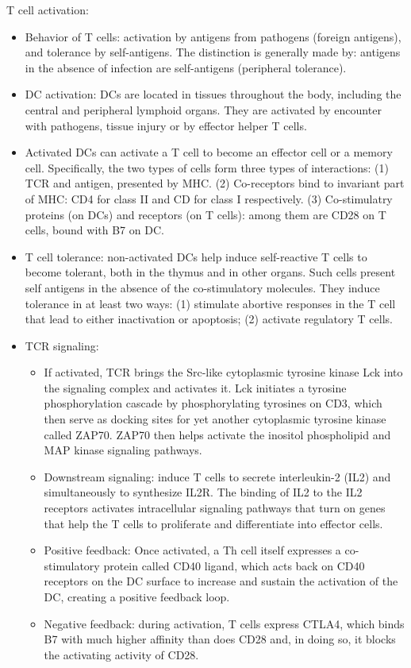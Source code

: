 \documentclass{report}
\begin{document}
T cell activation: 
\begin{itemize}
\item Behavior of T cells: activation by antigens from pathogens (foreign antigens), and tolerance by self-antigens. The distinction is generally made by: antigens in the absence of infection are self-antigens (peripheral tolerance). 

\item DC activation: DCs are located in tissues throughout the body, including the central and peripheral lymphoid organs. They are activated by encounter with pathogens, tissue injury or by effector helper T cells. 	

\item Activated DCs can activate a T cell to become an effector cell or a memory cell. Specifically, the two types of cells form three types of interactions: (1) TCR and antigen, presented by MHC. (2) Co-receptors bind to invariant part of MHC: CD4 for class II and CD for class I respectively. (3) Co-stimulatry proteins (on DCs) and receptors (on T cells): among them are CD28 on T cells, bound with B7 on DC.  
		
\item T cell tolerance: non-activated DCs help induce self-reactive T cells to become tolerant, both in the thymus and in other organs. Such cells present self antigens in the absence of the co-stimulatory molecules. They induce tolerance in at least two ways: (1) stimulate abortive responses in the T cell that lead to either inactivation or apoptosis; (2) activate regulatory T cells.

\item TCR signaling: 
\begin{itemize}
	\item If activated, TCR brings the Src-like cytoplasmic tyrosine kinase Lck into the signaling complex and activates it. Lck initiates a tyrosine phosphorylation cascade by phosphorylating tyrosines on CD3, which then serve as docking sites for yet another cytoplasmic tyrosine kinase called ZAP70. ZAP70 then helps activate the inositol phospholipid and MAP kinase signaling pathways. 
	\item Downstream signaling: induce T cells to secrete interleukin-2 (IL2) and simultaneously to synthesize IL2R. The binding of IL2 to the IL2 receptors activates intracellular signaling pathways that turn on genes that help the T cells to proliferate and differentiate into effector cells. 
	\item Positive feedback: Once activated, a Th cell itself expresses a co-stimulatory protein called CD40 ligand, which acts back on CD40 receptors on the DC surface to increase and sustain the activation of the DC, creating a positive feedback loop. 
	\item Negative feedback: during activation, T cells express CTLA4, which binds B7 with much higher affinity than does CD28 and, in doing so, it blocks the activating activity of CD28. 
\end{itemize}


\end{itemize}
\end{document}
